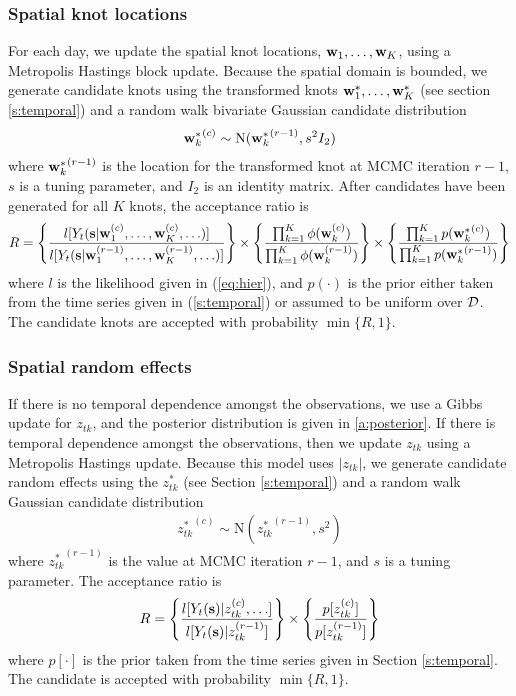 \documentclass[11pt]{article}
\begin{document}
\subsubsection*{Spatial knot locations}
For each day, we update the spatial knot locations, $\mbox{\bf w}_1, \ldots, \mbox{\bf w}_K$, using a Metropolis Hastings block update.
Because the spatial domain is bounded, we generate candidate knots using the transformed knots $\mbox{\bf w}^*_1, \ldots, \mbox{\bf w}^*_K$ (see section \ref{s:temporal}) and a random walk bivariate Gaussian candidate distribution
\begin{align*}
	{ \mbox{\bf w}^*_k}^{(c)} \sim \text{N}({\mbox{\bf w}^*_k}^{(r - 1)}, s^2 I_2)
\end{align*}
where ${\mbox{\bf w}^*_k}^{(r - 1)}$ is the location for the transformed knot at MCMC iteration $r - 1$, $s$ is a tuning parameter, and $I_2$ is an identity matrix.
After candidates have been generated for all $K$ knots, the acceptance ratio is
\begin{align*}
  R = \left\{ \frac{ l[ Y_t(\mbox{\bf s} | \mbox{\bf w}_1^{(c)}, \ldots, \mbox{\bf w}_K^{(c)}, \ldots)] }{l[ Y_t(\mbox{\bf s} | \mbox{\bf w}_1^{(r - 1)}, \ldots, \mbox{\bf w}_K^{(r - 1)}, \ldots)]} \right\} \times \left\{ \frac{ \prod_{k = 1}^{K}\phi(\mbox{\bf w}_k^{(c)})}{ \prod_{k = 1}^{K}\phi(\mbox{\bf w}_k^{(r - 1)})} \right\} \times \left\{ \frac{ \prod_{k = 1}^{K} p({\mbox{\bf w}^*_k}^{(c)})}{ \prod_{k = 1}^{K} p({\mbox{\bf w}^*_k}^{(r - 1)})}\right\}
\end{align*}
where $l$ is the likelihood given in (\ref{eq:hier}), and $p(\cdot)$ is the prior either taken from the time series given in (\ref{s:temporal}) or assumed to be uniform over ${\cal D}$.
The candidate knots are accepted with probability $\min\{R, 1\}$.

\subsubsection*{Spatial random effects}
If there is no temporal dependence amongst the observations, we use a Gibbs update for $z_{tk}$, and the posterior distribution is given in \ref{a:posterior}.
If there is temporal dependence amongst the observations, then we update $z_{tk}$ using a Metropolis Hastings update.
Because this model uses $|z_{tk}|$, we generate candidate random effects using the $z^*_{tk}$ (see Section \ref{s:temporal}) and a random walk Gaussian candidate distribution
\begin{align*}
  {z^*_{tk}}^{(c)} \sim \text{N}({z^*_{tk}}^{(r - 1)}, s^2)
\end{align*}
where ${z^*_{tk}}^{(r-1)}$ is the value at MCMC iteration $r - 1$, and $s$ is a tuning parameter.
The acceptance ratio is
\begin{align*}
  R = \left\{ \frac{ l[Y_t(\mbox{\bf s}) | z_{tk}^{(c)}, \ldots] }{ l[Y_t(\mbox{\bf s}) | z_{tk}^{(r - 1)}]} \right\} \times \left\{ \frac{ p[ z_{tk}^{(c)} ] }{ p[ z_{tk}^{(r - 1)}]}\right\}
\end{align*}
where $p[\cdot]$ is the prior taken from the time series given in Section \ref{s:temporal}.
The candidate is accepted with probability $\min\{R, 1\}$.
\end{document}
